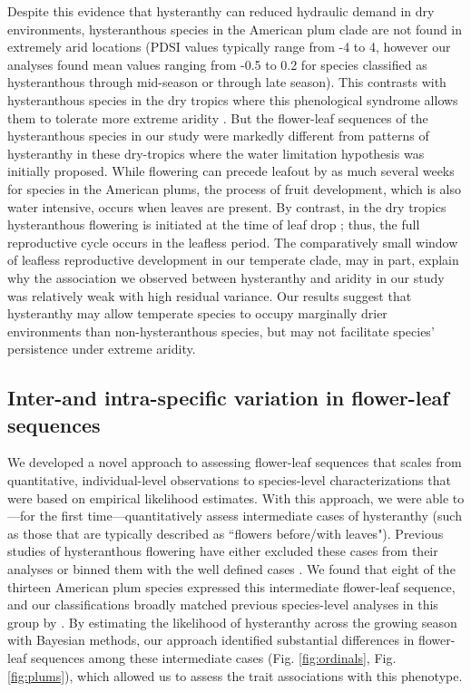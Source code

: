 \documentclass{article}[12pt]
\begin{document}
{ %
Despite this evidence that hysteranthy can reduced hydraulic demand in dry environments, hysteranthous species in the American plum clade are not found in extremely arid locations (PDSI values typically range from -4 to 4, however our analyses found mean values ranging from -0.5 to 0.2 for species classified as hysteranthous through mid-season or through late season). This contrasts with hysteranthous species in the dry tropics where this phenological syndrome allows them to tolerate more extreme aridity \citep{Franklin2016}. But the flower-leaf sequences of the hysteranthous species in our study were markedly different from patterns of hysteranthy in these dry-tropics where the water limitation hypothesis was initially proposed. While flowering can precede leafout by as much several weeks for species in the American plums, the process of fruit development, which is also water intensive, occurs when leaves are present. By contrast, in the dry tropics hysteranthous flowering is initiated at the time of leaf drop \citep{Borchert1983,Franklin2016}; thus, the full reproductive cycle occurs in the leafless period. The comparatively small window of leafless reproductive development in our temperate clade, may in part, explain why the association we observed between hysteranthy and aridity in our study was relatively weak with high residual variance. Our results suggest that hysteranthy may allow temperate species to occupy marginally drier environments than non-hysteranthous species, but may not facilitate species' persistence under extreme aridity. 

\subsection*{Inter-and intra-specific variation in flower-leaf sequences} %
We developed a novel approach to assessing flower-leaf sequences that scales from quantitative, individual-level observations to species-level characterizations that were based on empirical likelihood estimates. With this approach, we were able to---for the first time---quantitatively assess intermediate cases of hysteranthy (such as those that are typically described as ``flowers before/with leaves"). Previous studies of hysteranthous flowering have either excluded these cases from their analyses  \citep[e.g.;][]{Gougherty2018} or binned them with the well defined cases \citep[e.g.;][]{Buonaiuto2020}. We found that eight of the thirteen American plum species expressed this intermediate flower-leaf sequence, and our classifications broadly matched previous species-level analyses in this group by \citet{Shaw:2004aa}. By estimating the likelihood of hysteranthy across the growing season with Bayesian methods, our approach identified substantial differences in flower-leaf sequences among these intermediate cases (Fig. \ref{fig:ordinals}, Fig. \ref{fig:plums}), which allowed us to assess the trait associations with this phenotype.

}
\end{document}
